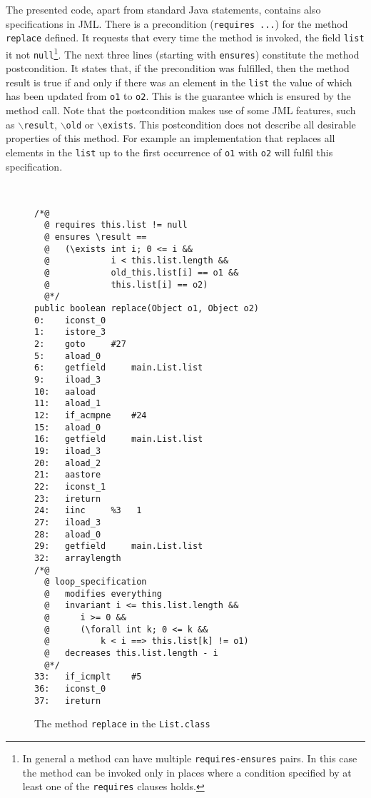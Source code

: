 \documentclass{llncs}
\begin{document}
The presented code, apart from standard Java statements, contains also
specifications in JML. There is a precondition (\texttt{requires ...})
for the method \texttt{replace} defined. It requests that every time
the method is invoked, the field \texttt{list} it not
\texttt{null}\footnote{In general a method can have multiple
  \texttt{requires-ensures} pairs. In this case the method can be
  invoked only in places where a condition specified by at least one
  of the \texttt{requires} clauses holds.}. The next three lines
(starting with \texttt{ensures}) constitute the method
postcondition. It states that, if the precondition was fulfilled, then
the method result is true if and only if there was an element in the
\texttt{list} the value of which has been updated from \texttt{o1} to
\texttt{o2}. This is the guarantee which is ensured by the method
call.  Note that the postcondition makes use of some JML features,
such as \texttt{$\backslash$result}, \texttt{$\backslash$old} or
\texttt{$\backslash$exists}. This postcondition does not describe all
desirable properties of this method. For example an implementation that replaces
all elements in the \texttt{list} up to the first occurrence of
\texttt{o1} with \texttt{o2} will fulfil this specification.
\begin{figure}[htb]
\lstset{language=bml}
\lstset{basicstyle=\scriptsize,stepnumber=400,numbersep=5pt}
\vspace{-2\baselineskip}
~\hspace{2cm}~\begin{minipage}{400pt}
\begin{lstlisting}
/*@
  @ requires this.list != null
  @ ensures \result ==
  @   (\exists int i; 0 <= i &&
  @            i < this.list.length &&
  @            old_this.list[i] == o1 &&
  @            this.list[i] == o2)
  @*/
public boolean replace(Object o1, Object o2)
0:    iconst_0
1:    istore_3
2:    goto	   #27
5:    aload_0
6:    getfield	   main.List.list
9:    iload_3
10:   aaload
11:   aload_1
12:   if_acmpne	   #24
15:   aload_0
16:   getfield	   main.List.list
19:   iload_3
20:   aload_2
21:   aastore
22:   iconst_1
23:   ireturn
24:   iinc	   %3	1
27:   iload_3
28:   aload_0
29:   getfield	   main.List.list
32:   arraylength
/*@
  @ loop_specification
  @   modifies everything
  @   invariant i <= this.list.length &&
  @      i >= 0 &&
  @      (\forall int k; 0 <= k &&
  @          k < i ==> this.list[k] != o1)
  @   decreases this.list.length - i
  @*/
33:   if_icmplt	   #5
36:   iconst_0
37:   ireturn
\end{lstlisting}
\end{minipage}

\vspace{-0.5\baselineskip}

\caption{The method \texttt{replace} in the \texttt{List.class}}
\label{fig:bytecode}
\end{figure}
\end{document}
